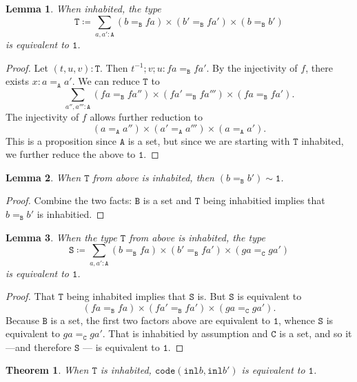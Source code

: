 \documentclass[12pt]{amsart}
\newcommand{\type}[1]{\mathtt{#1}}
\newcommand{\tin}{\colon}
\newcommand{\A}{\type{A}}
\newcommand{\B}{\type{B}}
\newcommand{\C}{\type{C}}
\newcommand{\inl}{\type{inl}}
\newcommand{\code}{\type{code}}
\newtheorem{lemma}{Lemma}
\newtheorem{thm}{Theorem}
\theoremstyle{remark}
\theoremstyle{definition}
\begin{document}
\begin{lemma}
  When inhabited, the type
  \[
    \type{T} \coloneqq \sum_{a,a' \tin \A} ( b =_{\B} fa ) \times ( b' =_{\B} fa' )
    \times ( b =_{\B} b' )
  \]
  is equivalent to \( \type{1} \). 
\end{lemma}

\begin{proof}
  Let \( (t,u,v) \tin \type{T} \).  Then \( t^{-1} ; v ; u \tin
  fa =_{\B} fa' \). By the injectivity of \( f \), there exists \( x
  \tin a =_{\A} a' \). We can reduce \( \type{T} \) to
  \[
    \sum_{a'',a''' \tin \A} ( fa =_{\B} fa'' ) \times ( fa' =_{\B} fa''' ) \times ( fa =_{\B} fa' ).
  \]
  The injectivity of \( f \) allows further reduction to
  \[
    ( a =_{\A} a'' ) \times ( a' =_{\A} a''' ) \times ( a =_{\A} a' ).
  \]
  This is a proposition since \( \A \) is a set, but since we are
  starting with \( \type{T} \) inhabited, we further reduce the above
  to \( \type{1} \).
\end{proof}

\begin{lemma}
  When \( \type{T} \) from above is inhabited, then \( ( b =_{\B} b' ) \sim \type{1} \). 
\end{lemma}

\begin{proof}
  Combine the two facts: \( \B \) is a set and \( \type{T} \) being
  inhabitied implies that \( b =_{\B} b' \) is inhabitied.
\end{proof}

\begin{lemma}
  When the type \( \type{T} \) from above is inhabited, the type
  \[
    \type{S} \coloneqq \sum_{a,a' \tin \A} ( b =_{\B} fa ) \times ( b' =_{\B} fa' )
    \times ( ga =_{\C} ga' )
  \]
  is equivalent to \( \type{1} \). 
\end{lemma}

\begin{proof}
  That \( \type{T} \) being inhabited implies that \( \type{S} \) is.
  But \( \type{S} \) is equivalent to
  \[
    ( fa =_{\B} fa ) \times ( fa' =_{\B} fa' ) \times ( ga =_{\C} ga' ).
  \]
  Because \( \B \) is a set, the first two factors above are
  equivalent to \( \type{1} \), whence \( \type{S} \) is equivalent to
  \( ga =_{\C} ga' \). That is inhabitied by assumption and \( \C \)
  is a set, and so it---and therefore \( \type{S} \) --- is equivalent
  to \( \type{1} \). 
\end{proof}

\begin{thm}
  When \( \type{T} \) is inhabited, \( \code ( \inl b , \inl b' ) \)
  is equivalent to \( \type{1} \).
\end{thm}
\end{document}
